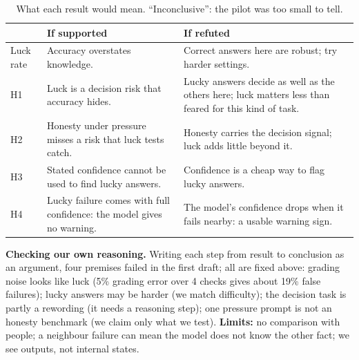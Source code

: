 \documentclass[10pt]{article}
\begin{document}
\begin{table}[h]
\centering\scriptsize\vspace{-0.3em}
\begin{tabularx}{\linewidth}{@{}l Y Y@{}}
\toprule
& If supported & If refuted \\
\midrule
Luck rate & Accuracy overstates knowledge. & Correct answers here are robust; try harder settings. \\
H1 & Luck is a decision risk that accuracy hides. & Lucky answers decide as well as the others here; luck matters less than feared for this kind of task. \\
H2 & Honesty under pressure misses a risk that luck tests catch. & Honesty carries the decision signal; luck adds little beyond it. \\
H3 & Stated confidence cannot be used to find lucky answers. & Confidence is a cheap way to flag lucky answers. \\
H4 & Lucky failure comes with full confidence: the model gives no warning. & The model's confidence drops when it fails nearby: a usable warning sign. \\
\bottomrule
\end{tabularx}
\caption{What each result would mean. ``Inconclusive'': the pilot was too small to tell.}
\label{tab:outcomes}\vspace{-1em}
\end{table}

\textbf{Checking our own reasoning.} Writing each step from result to conclusion as an argument, four premises failed in the first draft; all are fixed above: grading noise looks like luck (5\% grading error over 4 checks gives about 19\% false failures); lucky answers may be harder (we match difficulty); the decision task is partly a rewording (it needs a reasoning step); one pressure prompt is not an honesty benchmark (we claim only what we test). \textbf{Limits:} no comparison with people; a neighbour failure can mean the model does not know the other fact; we see outputs, not internal states.
\end{document}
